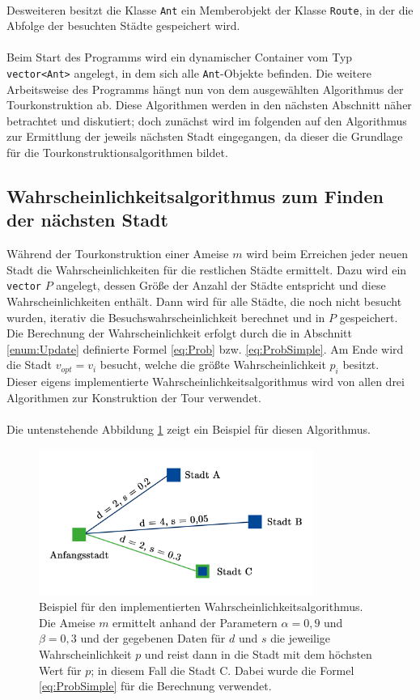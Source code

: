 \documentclass[doktyp=barbeit, sprache=german]{TUBAFarbeiten}
\begin{document}
\\Desweiteren besitzt die Klasse \texttt{Ant} ein Memberobjekt der Klasse \texttt{Route}, in der die Abfolge der besuchten Städte gespeichert wird. 
\\\\Beim Start des Programms wird ein dynamischer Container vom Typ \texttt{vector<Ant>} angelegt, in dem sich alle \texttt{Ant}-Objekte befinden. Die weitere Arbeitsweise des Programms hängt nun von dem ausgewählten Algorithmus der Tourkonstruktion ab. Diese Algorithmen werden in den nächsten Abschnitt näher betrachtet und diskutiert; doch zunächst wird im folgenden auf den Algorithmus zur Ermittlung der jeweils nächsten Stadt eingegangen, da dieser die Grundlage für die Tourkonstruktionsalgorithmen bildet.
\subsection{Wahrscheinlichkeitsalgorithmus zum Finden der nächsten Stadt}
\label{structure}
Während der Tourkonstruktion einer Ameise $m$ wird beim Erreichen jeder neuen Stadt die Wahrscheinlichkeiten für die restlichen Städte ermittelt. 
Dazu wird ein \texttt{vector} $P$ angelegt, dessen Größe der Anzahl der Städte entspricht und diese Wahrscheinlichkeiten enthält. Dann wird für alle Städte, die noch nicht besucht wurden, iterativ die Besuchswahrscheinlichkeit berechnet und in $P$ gespeichert. Die Berechnung der Wahrscheinlichkeit erfolgt durch die in Abschnitt \ref{enum:Update} definierte Formel \ref{eq:Prob} bzw. \ref{eq:ProbSimple}. Am Ende wird die Stadt $v_{opt} = v_i$ besucht, welche die größte Wahrscheinlichkeit $p_i$ besitzt. \\Dieser eigens implementierte Wahrscheinlichkeitsalgorithmus wird  von allen drei Algorithmen zur Konstruktion der Tour verwendet.
\\\\Die untenstehende Abbildung \ref{img:probimage} zeigt ein Beispiel für diesen Algorithmus. 
\begin{figure}
\captionsetup{justification=centering}
  \centering
     \includegraphics[width=0.8\textwidth]{images/probimage.png}
  \caption[Beispiel für den implementierten Wahrscheinlichkeitsalgorithmus]{Beispiel für den implementierten Wahrscheinlichkeitsalgorithmus. Die Ameise $m$ ermittelt anhand der Parametern $\alpha = 0,9$ und $\beta = 0,3$ und der gegebenen Daten für $d$ und $s$ die jeweilige Wahrscheinlichkeit $p$ und reist dann in die Stadt mit dem höchsten Wert für $p$; in diesem Fall die Stadt C. Dabei wurde die Formel \ref{eq:ProbSimple} für die Berechnung verwendet.}
  \label{img:probimage}
\end{figure}
\end{document}
